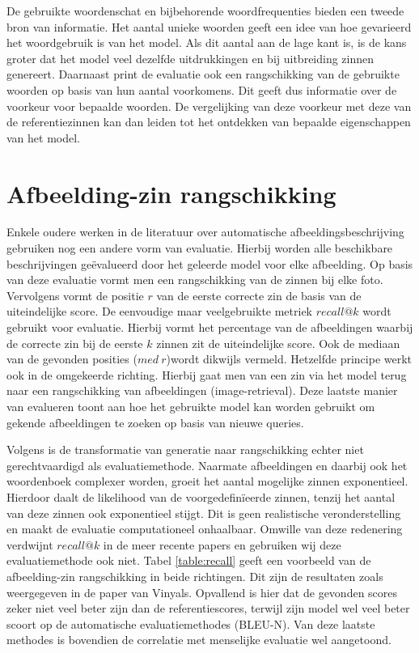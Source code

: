 De gebruikte woordenschat en bijbehorende woordfrequenties bieden een tweede bron van informatie. Het aantal unieke woorden geeft een idee van hoe gevarieerd het woordgebruik is van het model. Als dit aantal aan de lage kant is, is de kans groter dat het model veel dezelfde uitdrukkingen en bij uitbreiding zinnen genereert. Daarnaast print de evaluatie ook een rangschikking van de gebruikte woorden op basis van hun aantal voorkomens. Dit geeft dus informatie over de voorkeur voor bepaalde woorden. De vergelijking van deze voorkeur met deze van de referentiezinnen kan dan leiden tot het ontdekken van bepaalde eigenschappen van het model.

\section{Afbeelding-zin rangschikking}
Enkele oudere werken in de literatuur over automatische afbeeldingsbeschrijving gebruiken nog een andere vorm van evaluatie. Hierbij worden alle beschikbare beschrijvingen ge\"evalueerd door het geleerde model voor elke afbeelding. Op basis van deze evaluatie vormt men een rangschikking van de zinnen bij elke foto. Vervolgens vormt de positie $r$ van de eerste correcte zin de basis van de uiteindelijke score.  De eenvoudige maar veelgebruikte metriek $recall @ k$ wordt gebruikt voor evaluatie. Hierbij vormt het percentage van de afbeeldingen waarbij de correcte zin bij de eerste $k$ zinnen zit de uiteindelijke score. Ook de mediaan van de gevonden posities ($med\: r$)wordt dikwijls vermeld. Hetzelfde principe werkt ook in de omgekeerde richting. Hierbij gaat men van een zin via het model terug naar een rangschikking van afbeeldingen (image-retrieval). Deze laatste manier van evalueren toont aan hoe het gebruikte model kan worden gebruikt om gekende afbeeldingen te zoeken op basis van nieuwe queries. 

Volgens  is de transformatie van generatie naar rangschikking echter niet gerechtvaardigd als evaluatiemethode. Naarmate afbeeldingen en daarbij ook het woordenboek complexer worden, groeit het aantal mogelijke zinnen exponentieel. Hierdoor daalt de likelihood van de voorgedefin\"ieerde zinnen, tenzij het aantal van deze zinnen ook exponentieel stijgt. Dit is geen realistische veronderstelling en maakt de evaluatie computationeel onhaalbaar. Omwille van deze redenering verdwijnt $recall @ k$ in de meer recente papers en gebruiken wij deze evaluatiemethode ook niet. Tabel \ref{table:recall} geeft een voorbeeld van de afbeelding-zin rangschikking in beide richtingen. Dit zijn de resultaten zoals weergegeven in de paper van Vinyals. Opvallend is hier dat de gevonden scores zeker niet veel beter zijn dan de referentiescores, terwijl zijn model wel veel beter scoort op de automatische evaluatiemethodes (BLEU-N). Van deze laatste methodes is bovendien de correlatie met menselijke evaluatie wel aangetoond.


